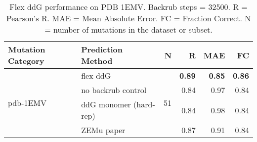 \begin{table}
  \begin{tabular}{llrrrr}
\toprule
Mutation Category &       Prediction Method &   N &    R &  MAE &   FC \\
\midrule
 \multirow{ 4}{*}{pdb-1EMV} & flex ddG & \multirow{ 4}{*}{51} & \textbf{0.89} & \textbf{0.85} & \textbf{0.86}  \\
 & no backrub control & & 0.84 & 0.97 & 0.84  \\
 & ddG monomer (hard-rep) & & 0.84 & 0.98 & 0.84  \\
 & ZEMu paper & & 0.87 & 0.91 & 0.84  \\
\bottomrule
\end{tabular}
  \caption[Flex ddG performance on PDB 1EMV]{
    Flex ddG performance on PDB 1EMV. Backrub steps = 32500. R = Pearson's R. MAE = Mean Absolute Error. FC = Fraction Correct. N = number of mutations in the dataset or subset.
  } \label{tab:table-pdb-1EMV}
\end{table}
